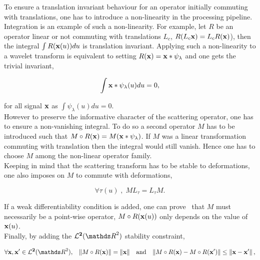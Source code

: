 \documentclass[a4paper,11pt]{report}
\begin{document}
      To ensure a translation invariant behaviour for an operator initially commuting with translations, one has to introduce a non-linearity in the processing pipeline. Integration is an example of such a non-linearity. For example, let $R$ be an operator linear or not commuting with translations $L_{c}$, \ie $R(L_{c}{\bf x}) = L_{c}R({\bf x})$), then the integral $\int R({\bf x}(u))du$ is  translation invariant. Applying such a non-linearity to a wavelet transform is equivalent to setting $R({\bf x}) = {\bf x} \ast \psi_{\lambda}$ and one gets the trivial invariant, 
      
      \begin{equation*}
				\label{eq:Trivial invariant}
				\int {\bf x} \ast \psi_{\lambda}(u)du = 0,
      \end{equation*}
      
      for all signal ${\bf x}$ as $\int \psi_{\lambda}(u)du = 0$.\\
      
      However to preserve the informative character of the scattering operator, one has to ensure a non-vanishing integral. To do so a second operator $M$ has to be introduced such that $M \circ R({\bf x}) = M({\bf x} \ast \psi_{\lambda})$. If $M$ was a linear transformation commuting with translation then the integral would still vanish. Hence one has to choose $M$ among the non-linear operator family.\\
      
      Keeping in mind that the scattering transform has to be stable to deformations, one also imposes on $M$ to commute with deformations, 
      
      \begin{equation*}
				\label{eq:Commute with deformations}
				\forall \tau(u) \; , \; M L_{\tau} = L_{\tau} M.
      \end{equation*}
      
      If a weak differentiability condition is added, one can prove~\citep{bruna2012commute} that $M$ must necessarily be a point-wise operator, \ie $M \circ R({\bf x}(u))$ only depends on the value of ${\bf x}(u)$.\\
      
      Finally, by adding the $\mathbf{\mcalL^{2}}(\dsR^{2})$ stability constraint,
      
      \begin{equation*}
				\label{eq:L2 stability}
				\forall \bfx,\bfx' \in \mathbf{\mcalL^{2}}(\dsR^{2}), \;\;\; 
				\norm{M \circ R(\bfx)} = \norm{\bfx} 
				\;\;\; \text{and} \;\;\;
				\norm{M \circ R(\bfx) - M \circ R(\bfx')} \leq \norm{\bfx-\bfx'},
      \end{equation*}     
      
\end{document}
